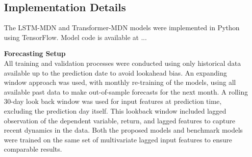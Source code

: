 \subsection{Implementation Details}
\label{sec:implementation_details}
The LSTM-MDN and Transformer-MDN models were implemented in Python using TensorFlow. Model code is available at ...

\textbf{Forecasting Setup} \\
All training and validation processes were conducted using only historical data available up to the prediction date to avoid lookahead bias. An expanding window approach was used, with monthly re-training of the models, using all available past data to make out-of-sample forecasts for the next month. A rolling 30-day look back window was used for input features at prediction time, excluding the prediction day itself. This lookback window included lagged observation of the dependent variable, return, and lagged features to capture recent dynamics in the data. Both the proposed models and benchmark models were trained on the same set of multivariate lagged input features to ensure comparable results. 



